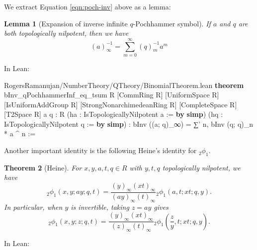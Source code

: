 \documentclass[12pt]{amsart}
\newtheorem{theorem}{Theorem}[subsection]
\newtheorem{lemma}[theorem]{Lemma}
\theoremstyle{definition}
\theoremstyle{remark}
\numberwithin{equation}{subsection}
\newcommand{\kw}[1]{\textcolor{keywordcolor}{\textbf{#1}}}
\newcommand{\var}[1]{\textcolor{tacticcolor}{#1}}
\newcommand{\imp}[1]{\textcolor{commentcolor}{\textbraceleft#1\textbraceright}}
\begin{document}
We extract Equation \ref{eqn:poch-inv} above as a lemma:
\begin{lemma}[Expansion of inverse infinite $q$-Pochhammer symbol]
    \label{lem:poch-inf-inv}
    If $a$ and $q$ are both topologically nilpotent, then we have
    \begin{equation}
        (a)_\infty^{-1} = \sum_{m=0}^{\infty} (q)_m^{-1} a^m
    \end{equation}
\end{lemma}

In Lean:

\begin{code}{RogersRamanujan/NumberTheory/QTheory/BinomialTheorem.lean}
\kw{theorem} bInv_qPochhammerInf_eq_tsum \imp{R} [CommRing \var{R}] [UniformSpace \var{R}]
  [IsUniformAddGroup \var{R}] [StrongNonarchimedeanRing \var{R}] [CompleteSpace \var{R}] [T2Space \var{R}]
  \imp{a q : R} (\var{ha} : IsTopologicallyNilpotent \var{a} := \kw{by} \kw{simp})
  (\var{hq} : IsTopologicallyNilpotent \var{q} := \kw{by} \kw{simp}) :
  bInv ((\var{a}; \var{q})_∞) = ∑' \var{n}, bInv (\var{q}; \var{q})_\var{n} * \var{a} ^ \var{n} :=
\end{code}

Another important identity is the following Heine's identity for ${}_{2}\phi_{1}$.
\begin{theorem}[Heine]
\label{thm:heine}
    For $x, y, a, t, q \in R$ with $y, t, q$ topologically nilpotent, we have
    \begin{equation}
        {}_{2}\phi_{1}(x,y;ay;q,t) = \frac{(y)_\infty(xt)_\infty}{(ay)_\infty(t)_\infty} {}_{2}\phi_{1}(a, t;xt;q,y). \label{eqn:heine'}
    \end{equation}
    In particular, when $y$ is invertible, taking $z = ay$ gives
    \begin{equation}
        {}_{2}\phi_{1}(x, y; z; q, t) = \frac{(y)_\infty (xt)_\infty}{(z)_\infty (t)_\infty} {}_{2}\phi_{1}\left(\frac{z}{y}, t ; xt; q, y\right).
        \label{eqn:heine}
    \end{equation}
\end{theorem}

In Lean:
\end{document}
